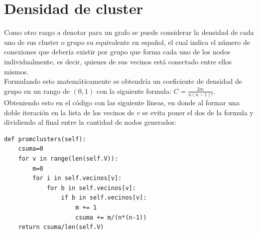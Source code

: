 \documentclass[12pt]{article}
\begin{document}
\section{Densidad de cluster}
Como otro rasgo a denotar para un grafo se puede considerar la densidad de cada uno de sus cluster o grupo su equivalente en español, el cual indica el número de conexiones que debería existir por grupo que forma cada uno de los nodos individualmente, es decir, quienes de sus vecinos está conectado entre ellos mismos.\\
Formulando esto matemáticamente se obtendría un coeficiente de densidad de grupo en un rango de $(0,1)$ con la siguiente formula: $C=\frac{2m}{n(n-1)!}$.\\ Obteniendo esto en el código con las siguiente líneas, en donde al formar una doble iteración en la lista de los vecinos de $v$ se evita poner el dos de la formula y dividiendo al final entre la cantidad de nodos generados:
\begin{lstlisting}[style=tt]
def promclusters(self):
	csuma=0
	for v in range(len(self.V)):
		m=0
		for i in self.vecinos[v]:
			for b in self.vecinos[v]:
				if b in self.vecinos[v]:
					m += 1
					csuma += m/(n*(n-1))
	return csuma/len(self.V)
\end{lstlisting}\pagebreak
\end{document}
